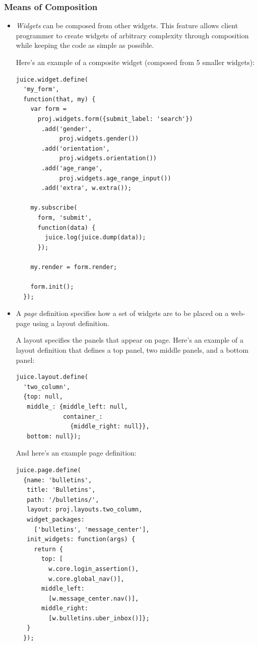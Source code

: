 \documentclass[10pt, twocolumn]{article}
\begin{document}
\subsubsection{Means of Composition}
\begin{itemize}
\item \emph{Widgets} can be composed from other widgets. This
  feature allows client programmer to create widgets of arbitrary
  complexity through composition while keeping the code as simple
  as possible.

  Here's an example of a composite widget (composed from 5 smaller
  widgets):
\begin{verbatim}
juice.widget.define(
  'my_form',
  function(that, my) {
    var form =
      proj.widgets.form({submit_label: 'search'})
       .add('gender',
            proj.widgets.gender())
       .add('orientation',
            proj.widgets.orientation())
       .add('age_range',
            proj.widgets.age_range_input())
       .add('extra', w.extra());

    my.subscribe(
      form, 'submit',
      function(data) {
        juice.log(juice.dump(data));
      });

    my.render = form.render;

    form.init();
  });
\end{verbatim}


\item A \emph{page} definition specifies how a set of widgets are
  to be placed on a web-page using a layout definition.

A layout specifies the panels that appear on page. Here's an
example of a layout definition that defines a top panel, two
middle panels, and a bottom panel:
\begin{verbatim}
juice.layout.define(
  'two_column',
  {top: null,
   middle_: {middle_left: null,
             container_:
               {middle_right: null}},
   bottom: null});
\end{verbatim}

And here's an example page definition:
\begin{verbatim}
juice.page.define(
  {name: 'bulletins',
   title: 'Bulletins',
   path: '/bulletins/',
   layout: proj.layouts.two_column,
   widget_packages:
     ['bulletins', 'message_center'],
   init_widgets: function(args) {
     return {
       top: [
         w.core.login_assertion(),
         w.core.global_nav()],
       middle_left:
         [w.message_center.nav()],
       middle_right:
         [w.bulletins.uber_inbox()]};
   }
  });
\end{verbatim}
\end{itemize}
\end{document}
